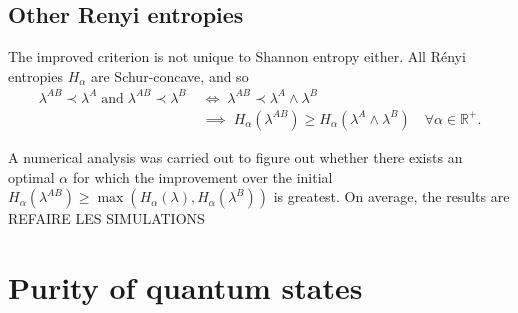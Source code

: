\subsection{Other Renyi entropies}

The improved criterion is not unique to Shannon entropy either. All Rényi entropies $H_\alpha$ are Schur-concave, and so
\begin{align}
    \lambda^{AB} \prec \lambda^A \; \text{and} \; \lambda^{AB} \prec \lambda^{B} \; &\iff \; \lambda^{AB} \prec \lambda^A \wedge \lambda^B \;\\ &\implies \; H_\alpha(\lambda^{AB}) \geq H_\alpha(\lambda^A \wedge \lambda^B) \quad \forall \alpha \in \mathbb{R}^+.
\end{align}

A numerical analysis was carried out to figure out whether there exists an optimal $\alpha$ for which the improvement over the initial $H_\alpha(\lambda^{AB}) \geq \max(H_\alpha(\lambda), H_\alpha(\lambda^B))$ is greatest. On average, the results are REFAIRE LES SIMULATIONS

\section{Purity of quantum states}


